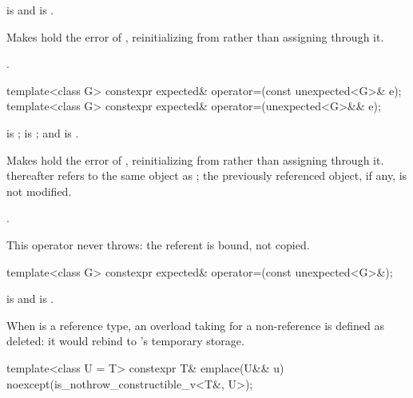 \begin{itemdescr}
\pnum
\constraints
{} is  and  is .

\pnum
\effects
Makes  hold the error of , reinitializing  from  rather than assigning through it.

\pnum
\returns
{}.
\end{itemdescr}

%
\begin{itemdecl}
template<class G> constexpr expected& operator=(const unexpected<G>& e);
template<class G> constexpr expected& operator=(unexpected<G>&& e);
\end{itemdecl}

\begin{itemdescr}
\pnum
\constraints
{} is ;  is ; and  is .

\pnum
\effects
Makes  hold the error of , reinitializing  from  rather than assigning through it.  thereafter refers to the same object as ; the previously referenced object, if any, is not modified.

\pnum
\returns
{}.

\pnum
\remarks
This operator never throws: the referent is bound, not copied.
\end{itemdescr}

%
\begin{itemdecl}
template<class G> constexpr expected& operator=(const unexpected<G>&);
\end{itemdecl}

\begin{itemdescr}
\pnum
\constraints
{} is  and  is .

\pnum
\remarks
When  is a reference type, an overload taking  for a non-reference  is defined as deleted: it would rebind  to 's temporary storage.
\end{itemdescr}

%
\begin{itemdecl}
template<class U = T>
constexpr T& emplace(U&& u) noexcept(is_nothrow_constructible_v<T&, U>);
\end{itemdecl}

